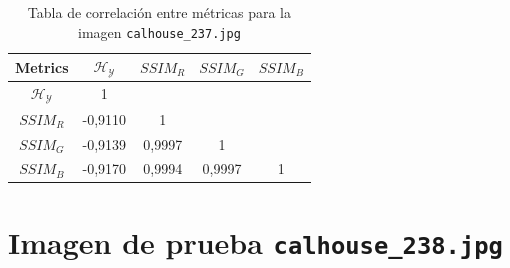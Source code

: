 \begin{table}[H]
\setlength{\abovecaptionskip}{2pt plus 3pt minus 2pt} %
\caption[Parámetros de entrada para $MOPSO$]{Tabla de correlación entre métricas para la imagen \texttt{calhouse\_237.jpg}}
\begin{center}
 \begin{tabular}{||c | c c c c||} 
 \hline
Metrics & $\mathscr{H_Y}$ & $SSIM_R$ & $SSIM_G$ & $SSIM_B$ \\ 
\hline
$\mathscr{H_Y}$ & 1 &  &  & \\ 
\hline
$SSIM_R$ & -0,9110 & 1 &  \\ 
\hline
$SSIM_G$ & -0,9139 & 0,9997  & 1  & \\ 
\hline
$SSIM_B$ & -0,9170 & 0,9994  & 0,9997  & 1 \\ 
\hline
\end{tabular}
\end{center}
\label{table:correlacion}
\end{table}

\section{Imagen de prueba \texttt{calhouse\_238.jpg}}

